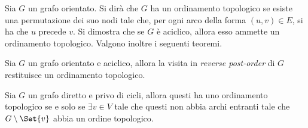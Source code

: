 \documentclass{subfiles}
\begin{document}
Sia \(G\) un grafo orientato. Si dirà che \(G\) ha un ordinamento topologico se esiste una permutazione dei suo nodi tale che,
per ogni arco della forma \((u, v) \in E\), si ha che \(u\) precede \(v\).
Si dimostra che se \(G\) è aciclico, allora esso ammette un ordinamento topologico. Valgono inoltre i seguenti teoremi.
\begin{Theorem}
    Sia \(G\) un grafo orientato e aciclico, allora la visita in \emph{reverse post-order} di \(G\) restituisce un ordinamento topologico.
\end{Theorem}
\begin{Theorem}
    Sia \(G\) un grafo diretto e privo di cicli, allora questi ha uno ordinamento topologico se e solo se \(\exists v \in V\) tale che questi non abbia archi entranti
    tale che \(G \setminus \Set{v}\) abbia un ordine topologico.
\end{Theorem}
\end{document}

